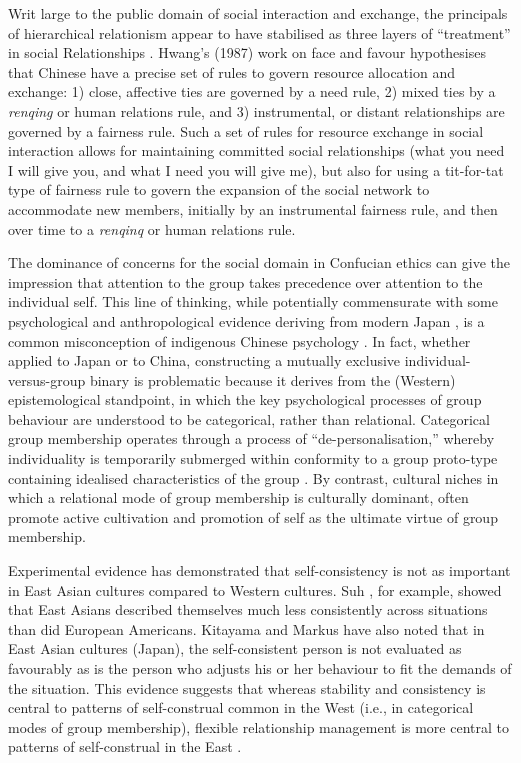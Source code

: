 \begin{CJK}{UTF8}{gbsn}
Writ large to the public domain of social interaction and exchange, the principals of hierarchical relationism appear to have stabilised as three layers of ``treatment'' in social Relationships \citep{Liu 2009}.  Hwang’s (1987) work on face and favour hypothesises that Chinese have a precise set of rules to govern resource allocation and exchange: 1) close, affective ties are governed by a need rule, 2) mixed ties by a \textit{renqing} or human relations rule, and 3) instrumental, or distant relationships are governed by a fairness rule.  Such a set of rules for resource exchange in social interaction allows for maintaining committed social relationships (what you need I will give you, and what I need you will give me), but also for using a tit-for-tat type of fairness rule to govern the expansion of the social network to accommodate new members, initially by an instrumental fairness rule, and then over time to a \textit{renqinq} or human relations rule.

The dominance of concerns for the social domain in Confucian ethics can give the impression that attention to the group takes precedence over attention to the individual self.  This line of thinking, while potentially commensurate with some psychological and anthropological evidence deriving from modern Japan \citep{Kitayama2010b}, is a common misconception of indigenous Chinese psychology \citep{Tu1998}.  In fact, whether applied to Japan or to China, constructing a mutually exclusive individual-versus-group binary is problematic because it derives from the (Western) epistemological standpoint, in which the key psychological processes of group behaviour are understood to be categorical, rather than relational.  Categorical group membership operates through a process of ``de-personalisation,'' whereby individuality is temporarily submerged within conformity to a group proto-type containing idealised characteristics of the group \citep{Turner1987}.  By contrast, cultural niches in which a relational mode of group membership is culturally dominant, often promote active cultivation and promotion of self as the ultimate virtue of group membership.

Experimental evidence has demonstrated that self-consistency is not as important in East Asian cultures compared to Western cultures.  Suh \textcite{Suh2002}, for example, showed that East Asians described themselves much less consistently across situations than did European Americans.  Kitayama and Markus \textcite{Kitayama1999} have also noted that in East Asian cultures (Japan), the self-consistent person is not evaluated as favourably as is the person who adjusts his or her behaviour to fit the demands of the situation.  This evidence suggests that whereas stability and consistency is central to patterns of self-construal common in the West (i.e., in categorical modes of group membership), flexible relationship management is more central to patterns of self-construal in the East \citep{Nisbett2001}.


\end{CJK}
